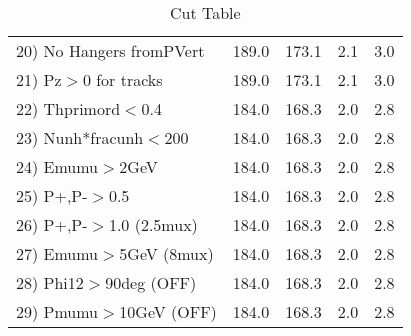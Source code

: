 \begin{table}[h!]
\begin{tabular}{||l||r|r|r|r||}
 20) No Hangers fromPVert &       189.0 &       173.1 &         2.1 &         3.0 \\
 21) Pz$>$0 for tracks    &       189.0 &       173.1 &         2.1 &         3.0 \\
 22) Thprimord$<$0.4      &       184.0 &       168.3 &         2.0 &         2.8 \\
 23) Nunh*fracunh$<$200   &       184.0 &       168.3 &         2.0 &         2.8 \\
 24) Emumu$>$2GeV         &       184.0 &       168.3 &         2.0 &         2.8 \\
 25) P+,P-$>$0.5          &       184.0 &       168.3 &         2.0 &         2.8 \\
 26) P+,P-$>$1.0 (2.5mux) &       184.0 &       168.3 &         2.0 &         2.8 \\
 27) Emumu$>$5GeV  (8mux) &       184.0 &       168.3 &         2.0 &         2.8 \\
 28) Phi12$>$90deg  (OFF) &       184.0 &       168.3 &         2.0 &         2.8 \\
 29) Pmumu$>$10GeV  (OFF) &       184.0 &       168.3 &         2.0 &         2.8 \\
 \hline
 \hline
 \end{tabular}
 \caption{Cut Table \cohpip }
 \label{tab-cut_copip}
 \end{table}
